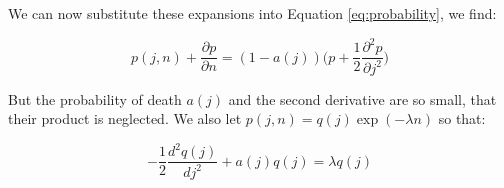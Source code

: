 \documentclass[journal]{IEEEtran}
\begin{document}
We can now substitute these expansions into Equation \ref{eq:probability}, we
find:

\begin{equation}
  p(j, n) + \frac{\partial p}{\partial n} = (1-a(j))\Big(p +
  \frac{1}{2}\frac{\partial^2 p}{\partial j^2}\Big)
  \nonumber
\end{equation}

But the probability of death $a(j)$ and the second derivative are so small, that
their product is neglected. We also let $p(j,n) = q(j) \exp(-\lambda n)$ so that:

\begin{equation}
  -\frac{1}{2} \frac{d^2q(j)}{dj^2} + a(j)q(j) = \lambda q(j)
  \nonumber
\end{equation}

\printbibliography
\end{document}
